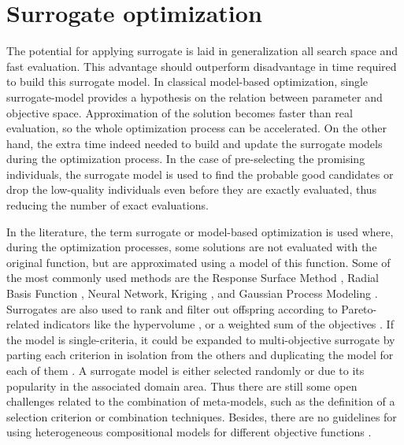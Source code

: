     \section{Surrogate optimization} 
        The potential for applying surrogate is laid in generalization all search space and fast evaluation. This advantage should outperform disadvantage in time required to build this surrogate model. In classical model-based optimization, single surrogate-model provides a hypothesis on the relation between parameter and objective space. Approximation of the solution becomes faster than real evaluation, so the whole optimization process can be accelerated. On the other hand, the extra time indeed needed to build and update the surrogate models during the optimization process. In the case of pre-selecting the promising individuals, the surrogate model is used to find the probable good candidates or drop the low-quality individuals even before they are exactly evaluated, thus reducing the number of exact evaluations.

        In the literature, the term surrogate or model-based optimization is used where, during the optimization processes, some solutions are not evaluated with the original function, but are approximated using a model of this function. Some of the most commonly used methods are the Response Surface Method \cite{ResponseSurface}, Radial Basis Function \cite{Rasmussen2004}, Neural Network, Kriging \cite{Woodard00}, and Gaussian Process Modeling \cite{RasmussenN10, RasmussenW06}. Surrogates are also used to rank and filter out offspring according to Pareto-related indicators like the hypervolume \cite{EmmerichGN06}, or a weighted sum of the objectives \cite{TaboadaBCW07}. If the model is single-criteria, it could be expanded to multi-objective surrogate by parting each criterion in isolation from the others and duplicating the model for each of them \cite{Knowles06, nardi2019practical}. A surrogate model is either selected randomly or due to its popularity in the associated domain area. Thus there are still some open challenges related to the combination of meta-models, such as the definition of a selection criterion or combination techniques. Besides, there are no guidelines for using heterogeneous compositional models for different objective functions \cite{SoftSurvey}.

